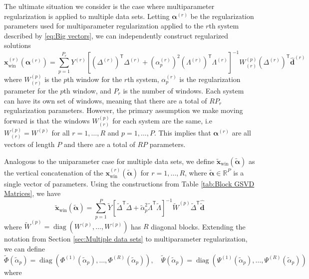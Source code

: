 \documentclass[12pt]{article}
\newcommand{\dVec}{\mathbf{d}}	%
\newcommand{\xVec}{\mathbf{x}}	%
\newcommand{\trans}[1]{{#1}^\mathsf{T}}	%
\newcommand{\inv}[1]{{#1}^{-1}}	%
\DeclareMathOperator{\diag}{diag}	%
\newcommand{\dft}[1]{\widehat{#1}}	%
\newcommand{\regparam}{\alpha}  %
\newcommand{\regparamVec}{\bm{\regparam}}   %
\newcommand{\regparamVecBig}{\widetilde{\regparamVec}}   %
\newcommand{\xWin}{\xVec_{\text{win}}}	%
\newcommand{\xBig}{\widetilde{\xVec}}	%
\newcommand{\xWinBig}{\xBig_{\text{win}}}	%
\newcommand{\dBig}{\widetilde{\dVec}}	%
\begin{document}
The ultimate situation we consider is the case where multiparameter regularization is applied to multiple data sets. Letting $\regparamVec^{(r)}$ be the regularization parameters used for multiparameter regularization applied to the $r$th system described by \eqref{eq:Big vectors}, we can independently construct regularized solutions
\[\xWin^{(r)}\left(\regparamVec^{(r)}\right) = \sum_{p=1}^{P_r} Y^{(r)}\inv{\left[\trans{\left(\Delta^{(r)}\right)}\Delta^{(r)} + \left(\regparam^{(r)}_p\right)^2 \trans{\left(\Lambda^{(r)}\right)}\Lambda^{(r)}\right]}W^{(p)}_{(r)}\trans{\left(\Delta^{(r)}\right)}\dft{\dVec}^{(r)}\]
where $W^{(p)}_{(r)}$ is the $p$th window for the $r$th system, $\regparam^{(r)}_p$ is the regularization parameter for the $p$th window, and $P_r$ is the number of windows. Each system can have its own set of windows, meaning that there are a total of $RP_r$ regularization parameters. However, the primary assumption we make moving forward is that the windows $W^{(p)}_{(r)}$ for each system are the same, i.e $W^{(p)}_{(r)} = W^{(p)}$ for all $r = 1,\ldots,R$ and $p = 1,\ldots,P$. This implies that $\regparamVec^{(r)}$ are all vectors of length $P$ and there are a total of $RP$ parameters. \par
Analogous to the uniparameter case for multiple data sets, we define $\xWinBig(\regparamVecBig)$ as the vertical concatenation of the $\xWin^{(r)}\left(\regparamVecBig\right)$ for $r = 1,\ldots,R$, where $\regparamVecBig \in \mathbb{R}^P$ is a single vector of parameters. Using the constructions from Table \ref{tab:Block GSVD Matrices}, we have
\begin{equation}
\label{eq:Big Windowed Solution}
    \xWinBig(\regparamVecBig) = \sum_{p=1}^{P} \widetilde{Y}\inv{\left[\trans{\widetilde{\Delta}}\widetilde{\Delta} + \widetilde{\regparam}_p^2 \trans{\widetilde{\Lambda}}\widetilde{\Lambda}\right]}\widetilde{W}^{(p)}\trans{\widetilde{\Delta}}\dft{\dBig}
\end{equation}
where $\widetilde{W}^{(p)} = \diag(W^{(p)},\ldots,W^{(p)})$ has $R$ diagonal blocks. Extending the notation from Section \ref{sec:Multiple data sets} to multiparameter regularization, we can define
\[\widetilde{\Phi}\left(\widetilde{\regparam}_{p}\right) = \diag\left(\Phi^{(1)}\left(\widetilde{\regparam}_{p}\right),\ldots,\Phi^{(R)}\left(\widetilde{\regparam}_{p}\right)\right), \quad \widetilde{\Psi}\left(\widetilde{\regparam}_{p}\right) = \diag\left(\Psi^{(1)}\left(\widetilde{\regparam}_{p}\right),\ldots,\Psi^{(R)}\left(\widetilde{\regparam}_{p}\right)\right)\]
where
\end{document}
